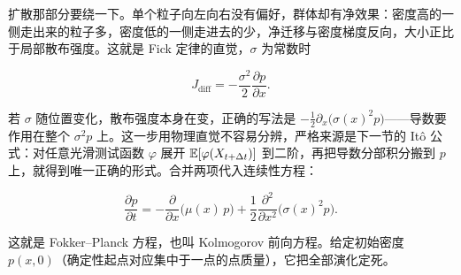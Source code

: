 扩散那部分要绕一下。单个粒子向左向右没有偏好，群体却有净效果：密度高的一侧走出来的粒子多，密度低的一侧走进去的少，净迁移与密度梯度反向，大小正比于局部散布强度。这就是 Fick 定律的直觉，\(\sigma\) 为常数时

\[
J_{\mathrm{diff}}=-\frac{\sigma^2}{2}\frac{\partial p}{\partial x}.
\]

若 \(\sigma\) 随位置变化，散布强度本身在变，正确的写法是 \(-\tfrac12\partial_x\big(\sigma(x)^2p\big)\)——导数要作用在整个 \(\sigma^2 p\) 上。这一步用物理直觉不容易分辨，严格来源是下一节的 Itô 公式：对任意光滑测试函数 \(\varphi\) 展开 \(\mathbb{E}[\varphi(X_{t+\Delta t})]\) 到二阶，再把导数分部积分搬到 \(p\) 上，就得到唯一正确的形式。合并两项代入连续性方程：

\[
\frac{\partial p}{\partial t}
=-\frac{\partial}{\partial x}\big(\mu(x)\,p\big)
+\frac12\frac{\partial^2}{\partial x^2}\big(\sigma(x)^2p\big).
\]

这就是 Fokker--Planck 方程，也叫 Kolmogorov 前向方程。给定初始密度 \(p(x,0)\)（确定性起点对应集中于一点的点质量），它把全部演化定死。

